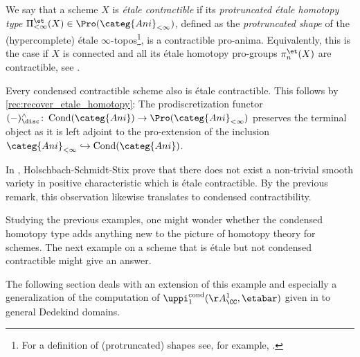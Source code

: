 \documentclass[leqno]{article}
\newcommand{\Ani}{\categ{Ani}}
\DeclareMathOperator{\Cond}{Cond}
\newcommand{\CondAni}{\Cond(\Ani)}
\newcommand{\cond}{\mathrm{cond}}
\newcommand{\prodisccompl}{^{\wedge}_{\disc}}
\newcommand{\Pietprotrun}{\Pi_{<\infty}^{\et}}
\newcommand{\picond}{\uppi^{\cond}}
\newcommand{\pionecond}{\picond_1}
\newcommand{\Anitrun}{\Ani_{<\infty}}
\newcommand{\ProAnitrun}{\Pro(\Anitrun)}
\begin{document}
%
\begin{recollection}
We say that a scheme $X$ is \textit{\'etale contractible} if its \textit{protruncated \'etale homotopy type} $\Pietprotrun(X)\in \ProAnitrun$, defined as the \textit{protruncated shape} of the (hypercomplete) \'etale $\infty$-topos\footnote{For a definition of (protruncated) shapes see, for example, \cite[Recollection 2.27]{The_condensed_homotopy_type}.}, is a contractible pro-anima. Equivalently, this is the case if $X$ is connected and all its \'etale homotopy pro-groups $\pi_n^{\et}(X)$ are contractible, see \cites[Remark 4.1.3]{Exodromy}[Corollary 4.4]{MR245577}.
\end{recollection}
%
\begin{remark}
Every condensed contractible scheme also is \'etale contractible.
This follows by \cref{rec:recover_etale_homotopy}: The prodiscretization functor $(-)\prodisccompl\colon\CondAni \rightarrow \ProAnitrun$ preserves the terminal object as it is left adjoint to the pro-extension of the inclusion $\Ani_{<\infty}\hookrightarrow \CondAni$.
\end{remark}
%
\begin{example}
In \cite[Theorem 1]{MR3248993}, Holschbach-Schmidt-Stix prove that there does not exist a non-trivial smooth variety in positive characteristic which is \'etale contractible.
By the previous remark, this observation likewise translates to condensed contractibility.
\end{example}
%
Studying the previous examples, one might wonder whether the condensed homotopy type adds anything new to the picture of homotopy theory for schemes. The next example on a scheme that is \'etale but not condensed contractible might give an answer. 
%
The following section deals with an extension of this example and especially a generalization of the computation of $\pionecond(\AA^1_{\CC}, \etabar)$ given in \cite[Section 7.1]{The_condensed_homotopy_type} to general Dedekind domains.
%
\end{document}
